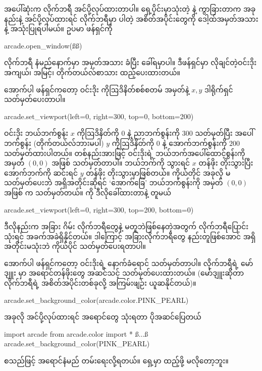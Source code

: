 အပေါ်ဆုံးက  လိုက်ဘရီ အင်ပို့လုပ်ထားတာပါ။ ရှေ့ပိုင်းမှာသုံးတဲ့  နဲ့ ကွာခြားတာက အခုနည်းနဲ့ အင်ပို့လုပ်ထားရင် လိုက်ဘရီမှာ ပါတဲ့ အစိတ်အပိုင်းတွေကို ဒေါ့ထ်အမှတ်အသားနဲ့ အသုံးပြုရပါမယ်။ ဥပမာ  ဖန်ရှင်ကို
\begin{codetxt}
arcade.open_window(ßß)
\end{codetxt} 
လိုက်ဘရီ နံမည်နောက်မှာ \fEn{(}\fEn{)} အမှတ်အသား ခံပြီး ခေါ်ရမှာပါ။ ဒီဖန်ရှင်မှာ လိုချင်တဲ့ဝင်းဒိုး အကျယ်၊ အမြင့်၊ တိုက်တယ်လ်စာသား ထည့်ပေးထားတယ်။ 

အောက်ပါ  ဖန်ရှင်ကတော့ ဝင်းဒိုး ကိုဩဒိနိတ်စစ်စတမ်  အမှတ်နဲ့  $x, y$ ဒါရိုက်ရှင် သတ်မှတ်ပေးတာပါ။
%
\begin{py}
arcade.set_viewport(left=0, right=300, top=0, bottom=200)
\end{py}
%
ဝင်းဒိုး ဘယ်ဘက်စွန်း $x$  ကိုဩဒိနိတ်ကို $0$ နဲ့ ညာဘက်စွန်းကို $300$ သတ်မှတ်ပြီး အပေါ်ဘက်စွန်း (တိုက်တယ်လ်ဘားမပါ) $y$ ကိုဩဒိနိတ်ကို $0$ နဲ့ အောက်ဘက်စွန်းကို $200$ သတ်မှတ်ထားပါတယ်။ တစ်နည်းအား\allowbreak ဖြင့် ဝင်းဒိုးရဲ့ ဘယ်ဘက်အပေါ်ထောင့်စွန်းကို  အမှတ် $(0,0)$ အဖြစ် သတ်မှတ်တာပါ။ ဘယ်ဘက်ကို သွားရင် $x$ တန်ဖိုး တိုးသွားပြီး အောက်ဘက်ကို ဆင်းရင် $y$ တန်ဖိုး တိုးသွားမှာဖြစ်တယ်။ ကိုယ်တိုင် အခုလို မသတ်မှတ်ပေးဘဲ  အရှိအတိုင်းဆိုရင် ‘အောက်ခြေ’ ဘယ်ဘက်စွန်းကို  အမှတ် $(0,0)$ အဖြစ်  က သတ်မှတ်တယ်။  ကို ဒီလိုခေါ်ထားတာနဲ့ တူမယ်
%
\begin{py}
arcade.set_viewport(left=0, right=300, top=200, bottom=0)
\end{py}
%
ဒီလိုနည်းက အခြား ဂိမ်း လိုက်ဘရီတွေနဲ့ မတူဘဲဖြစ်နေတဲ့အတွက်  လိုက်ဘရီပြောင်းသုံးရင် အခက်အခဲရှိနိုင်တယ်။ ဒါကြောင့် အခြားလိုက်ဘရီတွေ နည်းတူဖြစ်အောင် အရှိအတိုင်းမသုံးဘဲ ကိုယ်ပိုင် သတ်မှတ်ပေးရတာပါ။

အောက်ပါ ဖန်ရှင်ကတော့ ဝင်းဒိုးရဲ့ နောက်ခံရောင် သတ်မှတ်တာပါ။ လိုက်ဘရီရဲ့  မော်ဒျူး  မှာ အရောင်တန်ဖိုးတွေ အဆင်သင့် သတ်မှတ်ပေးထားတယ်။ (မော်ဒျူးဆိုတာ လိုက်ဘရီရဲ့ အစိတ်အပိုင်းတစ်ခုလို့ အကြမ်းဖျဉ်း ယူဆနိုင်တယ်)။ 
%
\begin{py}
arcade.set_background_color(arcade.color.PINK_PEARL)
\end{py}
%
အခုလို အင်ပို့လုပ်ထားရင် အရောင်တွေ သုံးရတာ ပိုအဆင်ပြေတယ်
%
\begin{py}
import arcade
from arcade.color import *
ß$\ldots$ß
arcade.set_background_color(PINK_PEARL)
\end{py}
%
\fEn{,}  စသည်ဖြင့် အရောင်နံမည် တမ်းရေးလို့ရတယ်။ ရှေ့မှာ  ထည့်ဖို့  မလိုတော့ဘူး။

